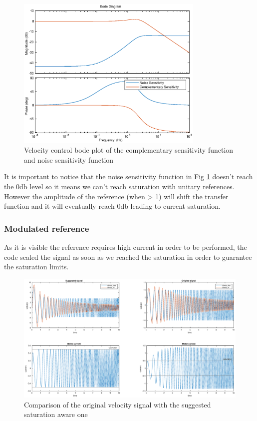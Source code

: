 \documentclass[a4paper,11pt]{article}
\begin{document}
\begin{figure}[H]
  \begin{center}
  \includegraphics[width=0.8\textwidth]{images/velocity_tf.eps}
  \end{center}
  \caption{Velocity control bode plot of the complementary sensitivity function and noise sensitivity function}
  \label{fig:velocity_tf}
  \end{figure}
\bigskip 

It is important to notice that the noise sensitivity function in Fig \ref{fig:velocity_tf} doesn't reach the 0db level so it means we can't reach saturation with unitary references. However the amplitude of the reference (when > 1) will shift the transfer function and it will eventually reach 0db leading to current saturation.

\newpage
\subsubsection{Modulated reference}
\noindent As it is visible the reference requires high current in order to be performed, the code scaled the signal as soon as we reached the saturation in order to guarantee the saturation limits.
\begin{figure}[H]
  \begin{center}
  \hspace*{-5cm}
  \includegraphics[width=1.6\textwidth]{images/velocity_tau.eps}
  \end{center}
  \caption{Comparison of the original velocity signal with the suggested saturation aware one}
  \label{fig:velocity_tau}
  \end{figure}
\end{document}
